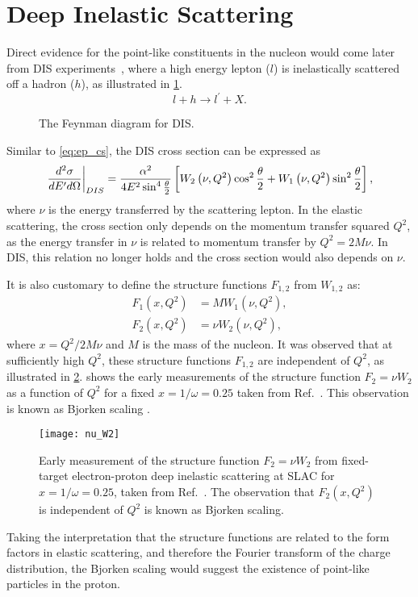 \documentclass[../main.tex]{subfiles}
\begin{document}
\section{Deep Inelastic Scattering}
\label{sec:dis}
Direct evidence for the point-like constituents in the nucleon would come later from DIS
experiments~\cite{breidenbach1969}, where a high
energy lepton ($l$) is inelastically scattered off a hadron ($h$), as
illustrated in \cref{fig:DIS}.
\begin{equation}
	l + h \rightarrow l^\prime + X.
\end{equation}
\begin{figure}[htbp!]
	\centering
	
	\caption{The Feynman diagram for DIS.}
	\label{fig:DIS}
\end{figure}
Similar to \cref{eq:ep_cs}, the DIS cross section can be expressed as
\begin{equation}
	\eval{\frac{d^2\sigma}{dE^\prime d\Omega}}_{DIS} = \frac{\alpha^2}{4E^2 \sin^4
		\frac{\theta}{2}} \left[ W_2\left(\nu,Q^2\right)\cos^2
		\frac{\theta}{2} + W_1\left(\nu,Q^2\right)\sin^2 \frac{\theta}{2}
		\right],
	\label{eq:DIS_cs1}
\end{equation}
where $\nu$ is the energy transferred by the scattering lepton.
In the elastic scattering, the cross section only depends on the momentum transfer squared $Q^2$,
as the energy transfer in $\nu$ is related to momentum transfer by $Q^2=2M\nu$.
In DIS, this relation no longer holds and the cross section would also depends on $\nu$.

It is also customary to define the structure functions $F_{1,2}$ from $W_{1,2}$ as:
\begin{equation}
	\begin{split}
		F_1\left(x,Q^2\right) & = MW_1\left(\nu,Q^2\right),    \\
		F_2\left(x,Q^2\right) & = \nu W_2\left(\nu,Q^2\right),
	\end{split}
\end{equation}
where $x=Q^2/2M\nu$ and $M$ is the mass of the nucleon. It was observed that at sufficiently high $Q^2$,
these structure functions $F_{1,2}$ are independent of $Q^2$, as illustrated in
\cref{fig:w2}.  shows the early measurements of the
structure function $F_2=\nu W_2$ as a function of $Q^2$ for a fixed
$x=1/\omega=0.25$ taken from Ref.~\cite{friedman1972}. This observation is
known as Bjorken scaling \cite{bjorken1969}.
\begin{figure}[htpb!]
	\centering
	\texttt{[image: nu\_W2]}
	\caption{Early measurement of the structure function $F_2=\nu W_2$ from
		fixed-target electron-proton deep inelastic scattering at SLAC for
		$x=1/\omega=0.25$, taken from Ref.~\cite{friedman1972}. The observation
		that $F_2(x,Q^2)$ is independent of $Q^2$ is known as Bjorken scaling. }
	\label{fig:w2}
\end{figure}
Taking the interpretation that the structure functions are related to the form factors in elastic scattering,
and therefore the Fourier transform of the charge distribution, the Bjorken scaling would suggest
the existence of point-like particles in the proton.
\end{document}

